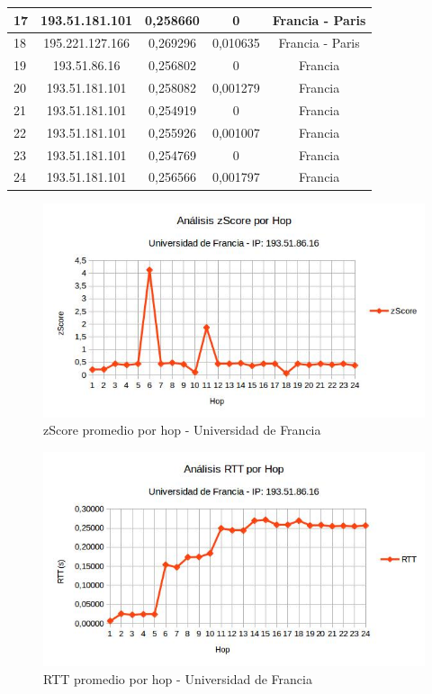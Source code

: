 \begin{tabular}{ | l | c | c | c | c |}
  \hline 
   17 & 193.51.181.101 & 0,258660 & 0 & Francia - Paris\\
  \hline 
   18 & 195.221.127.166 & 0,269296 & 0,010635 & Francia - Paris\\
  \hline 
   19 & 193.51.86.16 & 0,256802 & 0 & Francia\\
  \hline 
   20 & 193.51.181.101 & 0,258082 & 0,001279 & Francia\\
  \hline 
   21 & 193.51.181.101 & 0,254919 & 0 & Francia\\
  \hline 
   22 & 193.51.181.101 & 0,255926 & 0,001007 & Francia\\
  \hline 
   23 & 193.51.181.101 & 0,254769 & 0 & Francia\\
  \hline 
   24 & 193.51.181.101 & 0,256566 & 0,001797 & Francia\\
    
 \hline 
\end{tabular}

\bigskip

\begin{figure}[H]
\centering
\includegraphics[width=1\textwidth]{graficos/zScore_Francia.jpg}
\caption{zScore promedio por hop - Universidad de Francia}
\label{francia_zs}
\end{figure}

\begin{figure}[H]
\centering
\includegraphics[width=1\textwidth]{graficos/rTT_Francia.jpg}
\caption{RTT promedio por hop - Universidad de Francia}
\label{francia_rtt}
\end{figure}


\newpage



